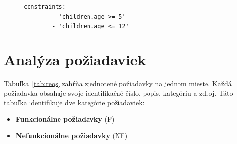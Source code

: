 \begin{figure}[H]
    \centering
    \begin{lstlisting}[caption={Constraints sekcia pre ukážkovú databázu.}, frame=single, linewidth=0.75\textwidth, xleftmargin=0.260\textwidth, label={lst:recipe-constraints}]
    constraints:
        - 'children.age >= 5'
        - 'children.age <= 12'
    \end{lstlisting}

\end{figure}


\section{Analýza požiadaviek}

\label{sub:analyza_poziadaviek}

Tabuľka~\ref{tab:reqs} zahŕňa zjednotené požiadavky na jednom mieste. Každá požiadavka obsahuje svoje identifikačné číslo, popis, kategóriu a zdroj. Táto tabuľka identifikuje dve kategórie požiadaviek:
\begin{itemize}
    \item \textbf{Funkcionálne požiadavky} (F)
    \item \textbf{Nefunkcionálne požiadavky} (NF)
\end{itemize}

